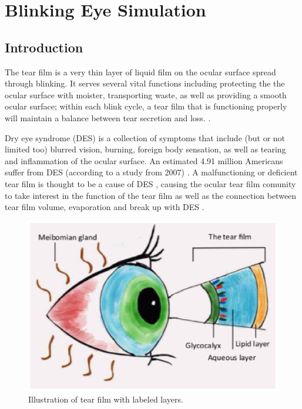 \chapter{Blinking Eye Simulation}

\section{Introduction}

The tear film is a very thin layer of liquid film on the ocular surface spread through blinking. It serves several vital functions including protecting the the ocular surface with moister, transporting waste, as well as providing a smooth ocular surface; within each blink cycle, a tear film that is functioning properly will maintain a balance between tear secretion and loss. \cite{holly1977tear}.

	Dry eye syndrome (DES) is a collection of symptoms that include (but or not limited too) blurred vision, burning, foreign body sensation, as well as tearing and inflammation of the ocular surface. An estimated 4.91 million Americans suffer from DES (according to a study from 2007) \cite{bron2007methodologies}. A malfunctioning or deficient tear film is thought to be a cause of DES \cite{nelson2011international}, causing the ocular tear film comunity to take interest in the function of the tear film \cite{johnson2004changes} as well as the connection between tear film volume, evaporation and break up with DES \cite{bron2007methodologies}.
	
\begin{figure}
  \centering
  \includegraphics[scale=0.6]{Chapter4/eye_model.eps}
  \caption{Illustration of tear film with labeled layers.}
  \label{eye_levels}
\end{figure}

